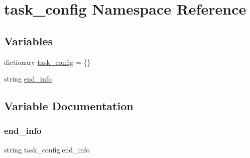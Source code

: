 \hypertarget{namespacetask__config}{}\section{task\+\_\+config Namespace Reference}
\label{namespacetask__config}
\subsection*{Variables}
\begin{DoxyCompactItemize}
\item 
dictionary \hyperlink{namespacetask__config_a8cfaff6001fe42b45a67d0cd6a5f7b3b}{task\+\_\+config} = \{\}
\item 
string \hyperlink{namespacetask__config_a5d72a7cfe91f48975eda4cde05be9988}{end\+\_\+info}
\end{DoxyCompactItemize}


\subsection{Variable Documentation}
\mbox{\label{namespacetask__config_a5d72a7cfe91f48975eda4cde05be9988}} 
\subsubsection{\texorpdfstring{end\+\_\+info}{end\_info}}
{\footnotesize\ttfamily string task\+\_\+config.\+end\+\_\+info}

